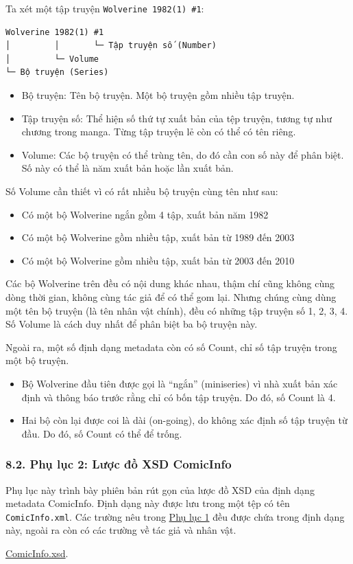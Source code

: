 \documentclass[
]{article}
\begin{document}
Ta xét một tập truyện \texttt{Wolverine\ 1982(1)\ \#1}:

\begin{verbatim}
Wolverine 1982(1) #1
│         │       └─ Tập truyện số (Number)
│         └─ Volume
└─ Bộ truyện (Series)
\end{verbatim}

\begin{itemize}
\item
  Bộ truyện: Tên bộ truyện. Một bộ truyện gồm nhiều tập truyện.
\item
  Tập truyện số: Thể hiện số thứ tự xuất bản của tệp truyện, tương tự
  như chương trong manga. Từng tập truyện lẻ còn có thể có tên riêng.
\item
  Volume: Các bộ truyện có thể trùng tên, do đó cần con số này để phân
  biệt. Số này có thể là năm xuất bản hoặc lần xuất bản.
\end{itemize}

Số Volume cần thiết vì có rất nhiều bộ truyện cùng tên như sau:

\begin{itemize}
\item
  Có một bộ Wolverine ngắn gồm 4 tập, xuất bản năm 1982
\item
  Có một bộ Wolverine gồm nhiều tập, xuất bản từ 1989 đến 2003
\item
  Có một bộ Wolverine gồm nhiều tập, xuất bản từ 2003 đến 2010
\end{itemize}

Các bộ Wolverine trên đều có nội dung khác nhau, thậm chí cũng không
cùng dòng thời gian, không cùng tác giả để có thể gom lại. Nhưng chúng
cùng dùng một tên bộ truyện (là tên nhân vật chính), đều có những tập
truyện số 1, 2, 3, 4. Số Volume là cách duy nhất để phân biệt ba bộ
truyện này.

Ngoài ra, một số định dạng metadata còn có số Count, chỉ số tập truyện
trong một bộ truyện.

\begin{itemize}
\item
  Bộ Wolverine đầu tiên được gọi là ``ngắn'' (miniseries) vì nhà xuất
  bản xác định và thông báo trước rằng chỉ có bốn tập truyện. Do đó, số
  Count là 4.
\item
  Hai bộ còn lại được coi là dài (on-going), do không xác định số tập
  truyện từ đầu. Do đó, số Count có thể để trống.
\end{itemize}

\hypertarget{phux1ee5-lux1ee5c-2-lux1b0ux1ee3c-ux111ux1ed3-xsd-comicinfo}{%
\subsubsection{\texorpdfstring{8.2. Phụ lục 2: Lược đồ XSD ComicInfo
}{8.2. Phụ lục 2: Lược đồ XSD ComicInfo }}\label{phux1ee5-lux1ee5c-2-lux1b0ux1ee3c-ux111ux1ed3-xsd-comicinfo}}

Phụ lục này trình bày phiên bản rút gọn của lược đồ XSD của định dạng
metadata ComicInfo. Định dạng này được lưu trong một tệp có tên
\texttt{ComicInfo.xml}. Các trường nêu trong
\protect\hyperlink{P9.1-metadata}{Phụ lục 1} đều được chứa trong định
dạng này, ngoài ra còn có các trường về tác giả và nhân vật.

\href{../assets/ComicInfo.xsd}{ComicInfo.xsd}.
\end{document}
